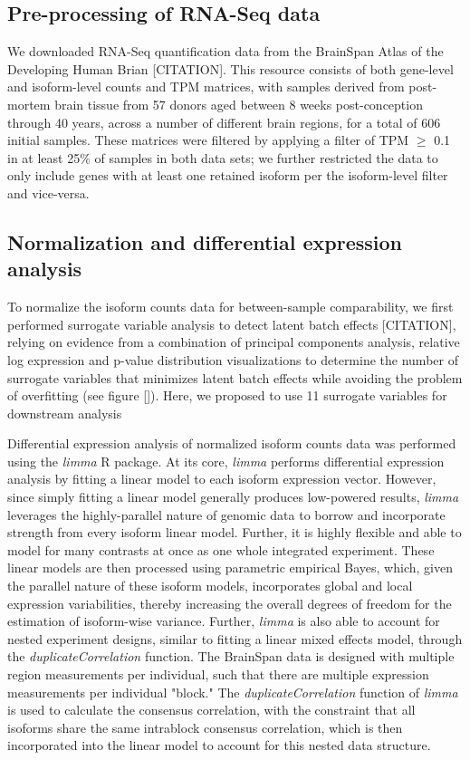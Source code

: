 \subsection{Pre-processing of RNA-Seq data}
We downloaded RNA-Seq quantification data from the BrainSpan Atlas of the Developing Human Brian [CITATION]. This resource consists of both gene-level and isoform-level counts and TPM matrices, with samples derived from post-mortem brain tissue from 57 donors aged between 8 weeks post-conception through 40 years, across a number of different brain regions, for a total of 606 initial samples. These matrices were filtered by applying a filter of TPM $\geq$ 0.1 in at least 25\% of samples in both data sets; we further restricted the data to only include genes with at least one retained isoform per the isoform-level filter and vice-versa.

\subsection{Normalization and differential expression analysis}
To normalize the isoform counts data for between-sample comparability, we first performed surrogate variable analysis to detect latent batch effects [CITATION], relying on evidence from a combination of principal components analysis, relative log expression and p-value distribution visualizations to determine the number of surrogate variables that minimizes latent batch effects while avoiding the problem of overfitting (see figure []). Here, we proposed to use 11 surrogate variables for downstream analysis\par

Differential expression analysis of normalized isoform counts data was performed using the \textit{limma} R package. At its core, \textit{limma} performs differential expression analysis by fitting a linear model to each isoform expression vector. However, since simply fitting a linear model generally produces low-powered results, \textit{limma} leverages the highly-parallel nature of genomic data to borrow and incorporate strength from every isoform linear model. Further, it is highly flexible and able to model for many contrasts at once as one whole integrated experiment. These linear models are then processed using parametric empirical Bayes, which, given the parallel nature of these isoform models, incorporates global and local expression variabilities, thereby increasing the overall degrees of freedom for the estimation of isoform-wise variance. Further, \textit{limma} is also able to account for nested experiment designs, similar to fitting a linear mixed effects model, through the \textit{duplicateCorrelation} function. The BrainSpan data is designed with multiple region measurements per individual, such that there are multiple expression measurements per individual "block." The \textit{duplicateCorrelation} function of \textit{limma} is used to calculate the consensus correlation, with the constraint that all isoforms share the same intrablock consensus correlation, which is then incorporated into the linear model to account for this nested data structure. 

